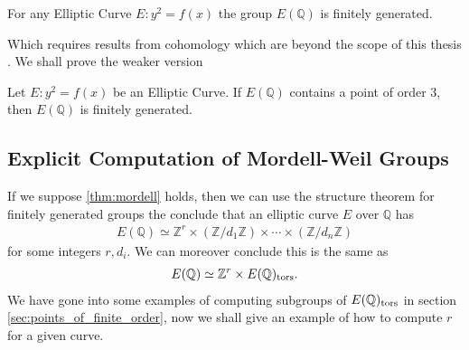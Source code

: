 \begin{theorem}
  For any Elliptic Curve $E: y^2 = f(x)$ the group $E(\mathbb{Q})$ is finitely
  generated.
\end{theorem}
Which requires results from cohomology which are beyond the
scope of this thesis \cite[Section VIII]{silvermanArithmetic} .
We shall prove the weaker version
\begin{theorem} \label{thm:mordell}
  Let $E: y^2 = f(x)$ be an Elliptic Curve. If
  $E(\mathbb{Q})$ contains a point of order 3, then
  $E(\mathbb{Q})$ is finitely generated.
\end{theorem}

\subsection{Explicit Computation of Mordell-Weil Groups}%
\label{sub:explicit_computation_of_mordell_weil_groups}
If we suppose \ref{thm:mordell} holds, then we can use the
structure theorem for finitely generated groups \cite[Theorem 8.1]{sergeLangAlgebra}
the conclude that an elliptic curve $E$ over $\mathbb{Q}$ has
\begin{align*}
  E(\mathbb{Q}) \simeq \mathbb{Z}^{r} \times (\mathbb{Z}/d_1\mathbb{Z}) \times \cdots \times (\mathbb{Z}/d_n\mathbb{Z})
\end{align*}
for some integers $r, d_i$. We can moreover conclude this is the same as
\begin{align*}
  E(\mathbb{Q}) \simeq \mathbb{Z}^{r} \times E(\mathbb{Q})_{\operatorname{tors}}.
\end{align*}
We have gone into some examples of computing subgroups of $E(\mathbb{Q})_{\operatorname{tors}}$
in section \ref{sec:points_of_finite_order}, now we shall give
an example of how to
compute $r$ for a given curve.
